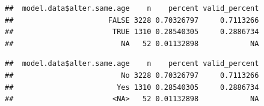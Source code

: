 \documentclass[
]{book}
\newenvironment{Shaded}{\begin{snugshade}}{\end{snugshade}}
\newcommand{\AttributeTok}[1]{\textcolor[rgb]{0.77,0.63,0.00}{#1}}
\newcommand{\CommentTok}[1]{\textcolor[rgb]{0.56,0.35,0.01}{\textit{#1}}}
\newcommand{\FunctionTok}[1]{\textcolor[rgb]{0.00,0.00,0.00}{#1}}
\newcommand{\NormalTok}[1]{#1}
\newcommand{\SpecialCharTok}[1]{\textcolor[rgb]{0.00,0.00,0.00}{#1}}
\newcommand{\StringTok}[1]{\textcolor[rgb]{0.31,0.60,0.02}{#1}}
\begin{document}
\begin{verbatim}
##  model.data$alter.same.age    n    percent valid_percent
##                      FALSE 3228 0.70326797     0.7113266
##                       TRUE 1310 0.28540305     0.2886734
##                         NA   52 0.01132898            NA
\end{verbatim}

\begin{Shaded}
\end{Shaded}

\begin{verbatim}
##  model.data$alter.same.age    n    percent valid_percent
##                         No 3228 0.70326797     0.7113266
##                        Yes 1310 0.28540305     0.2886734
##                       <NA>   52 0.01132898            NA
\end{verbatim}
\end{document}
